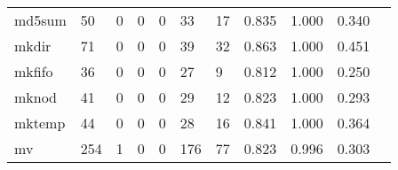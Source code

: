 \begin{longtable}{lp{1.2cm}p{1.2cm}p{1.2cm}p{1.2cm}p{1.2cm}p{1.2cm}p{1.2cm}p{1.2cm}p{1.2cm}p{1.2cm}}
md5sum    &                                    50 &                                                  0 &                                                  0 &                                                  0 &                                                 33 &                                                 17 &                                         0.835 &                                              1.000 &                                              0.340 \\
mkdir     &                                    71 &                                                  0 &                                                  0 &                                                  0 &                                                 39 &                                                 32 &                                         0.863 &                                              1.000 &                                              0.451 \\
mkfifo    &                                    36 &                                                  0 &                                                  0 &                                                  0 &                                                 27 &                                                  9 &                                         0.812 &                                              1.000 &                                              0.250 \\
mknod     &                                    41 &                                                  0 &                                                  0 &                                                  0 &                                                 29 &                                                 12 &                                         0.823 &                                              1.000 &                                              0.293 \\
mktemp    &                                    44 &                                                  0 &                                                  0 &                                                  0 &                                                 28 &                                                 16 &                                         0.841 &                                              1.000 &                                              0.364 \\
mv        &                                   254 &                                                  1 &                                                  0 &                                                  0 &                                                176 &                                                 77 &                                         0.823 &                                              0.996 &                                              0.303 \\

\end{longtable}
